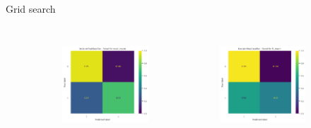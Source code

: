 \begin{frame}{\subsecname\: Grid search}
\begin{columns}[t]
\begin{figure}
\begin{columns}[t]
\begin{subfigure}[c]{\textwidth}
                        \includegraphics[width=\textwidth]{images/models/DT_recmacro.png}
                        \caption{}
                        \label{fig:DT_recmacro}
                    \end{subfigure}
                    \centering
                    \begin{subfigure}[c]{\textwidth}
                        \includegraphics[width=\textwidth]{images/models/DT_f1macro.png}

\end{subfigure}
\end{columns}
\end{figure}
\end{columns}
\end{frame}
